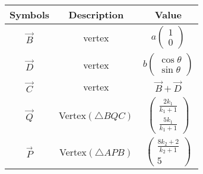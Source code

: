 \begin{tabular}{|c|c|c|}
\hline
    \textbf{Symbols} &\textbf{Description}&\textbf{Value} \\
    \hline
     $\vec{B}$& vertex &$a\begin{pmatrix}
     1\\0
     \end{pmatrix}$\\
     \hline
     $\vec{D}$& vertex &$b\begin{pmatrix}
    \cos{\theta} \\\sin{\theta}
     \end{pmatrix}$\\
     \hline
     $\vec{C}$& vertex & $\vec{B}+\vec{D}$\\
     \hline
     $\vec{ Q}$& Vertex$(\triangle BQC)$ & $\begin{pmatrix}
       \frac{2k_1}{k_1+1}\\\frac{5k_1}{k_1+1}
   \end{pmatrix}$\\
     \hline
      $\vec{P}$&  Vertex$(\triangle APB)$ &$\begin{pmatrix}
       \frac{8k_2+2}{k_2+1}\\5
   \end{pmatrix}$\\
   \hline
\end{tabular}
